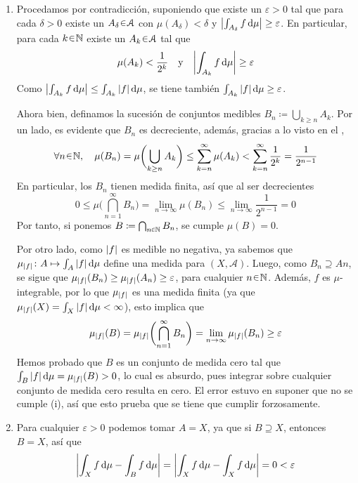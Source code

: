 \begin{sol}
\begin{enumerate}[label = (\roman*)]
\item %
Procedamos por contradicción, suponiendo que existe un $\varepsilon>0$ tal que para cada $\delta>0$ existe un $A_\delta \en \mathcal{A}$ con $\mu(A_\delta) < \delta$ y $\abs\big{\int_{A_\delta}f\dd{\mu}} \geq \varepsilon$. En particular, para cada $k\en\mathbb{N}$ existe un $A_k\en\mathcal{A}$ tal que
\[
\mu(A_k) < \frac{1}{2^k}
\quad\text{y}\quad
\abs{\int_{A_k}  f \dd{\mu}} \ge \varepsilon
\]
Como $\abs\big{\int_{A_k} f \dd{\mu}} \leq \int_{A_k} \abs{f} \dd{\mu}$, se tiene también $\int_{A_k} \abs{f} \dd{\mu} \geq \varepsilon$.\par
Ahora bien, definamos la sucesión de conjuntos medibles $B_n \coloneq \bigcup_{k\ge n} A_k$. Por un lado, es evidente que $B_n$ es decreciente, además, gracias a lo visto en el ,
\[
\forall n \en \mathbb{N},\quad
\mu(B_n) = \mu\biggl(\bigcup_{k\ge n} A_k\biggr) \leq \sum^\infty_{k=n} \mu(A_k) < \sum^\infty_{k=n} \frac{1}{2^k} = \frac{1}{2^{n-1}}
\]
En particular, los $B_n$ tienen medida finita, así que al ser decrecientes
\[
0 \leq \mu\biggl(\bigcap^\infty_{n=1}B_n\biggr) = \lim_{n\to\infty}\mu(B_n) \leq \lim_{n\to\infty}\frac{1}{2^{n-1}} = 0
\]
Por tanto, si ponemos $B \coloneq \bigcap_{n\en\mathbb{N}} B_n$, se cumple $\mu(B) = 0$.\par
Por otro lado, como $\abs{f}$ es medible no negativa, ya sabemos que $\mu_{\abs{f}} \colon A \mapsto\int_A\abs{f} \dd{\mu}$ define una medida para $(X,\mathcal{A})$. Luego, como $B_n \supseteq An$, se sigue que $\mu_{\abs{f}}(B_n) \geq \mu_{\abs{f}}(A_n) \geq \varepsilon$, para cualquier $n\en\mathbb{N}$. Además, $f$ es $\mu$-integrable, por lo que $\mu_{\abs{f}}$ es una medida finita (ya que $\mu_{\abs{f}}(X) = \int_X\abs{f} \dd{\mu} < \infty$), esto implica que 
\[
\mu_{\abs{f}}(B) = \mu_{\abs{f}}\biggl(\bigcap^{\infty}_{n=1}B_n\biggr) = \lim_{n\to\infty}\mu_{\abs{f}}(B_n) \geq \varepsilon
\]
Hemos probado que $B$ es un conjunto de medida cero tal que $\int_B \abs{f} \dd{\mu} =  \mu_{\abs{f}}(B) > 0$, lo cual es absurdo, pues integrar sobre cualquier conjunto de medida cero resulta en cero. El error estuvo en suponer que no se cumple (i), así que esto prueba que se tiene que cumplir forzosamente.
\item %
Para cualquier $\varepsilon>0$ podemos tomar $A=X$, ya que si $B \supseteq X$, entonces $B=X$, así que 
\[
\abs{\int_Xf \dd{\mu} - \int_B f \dd{\mu}} = \abs{\int_X f \dd{\mu} - \int_Xf \dd{\mu}} = 0 < \varepsilon
\]
\end{enumerate}
\end{sol}